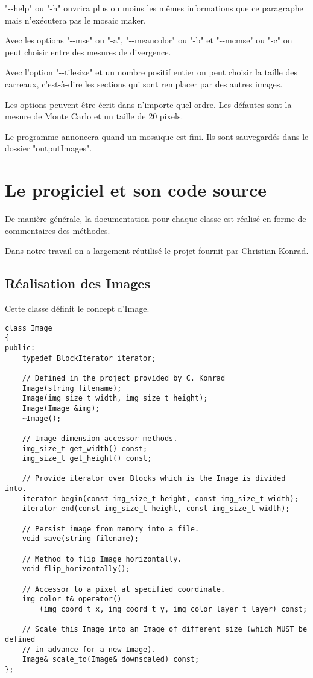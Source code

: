 \documentclass[a4paper]{article}
\begin{document}
"{-}{-}help" ou "-h" ouvrira plus ou moins les m\^emes informations que ce paragraphe mais n'ex\'ecutera pas le mosaic maker.

Avec les options "{-}{-}mse" ou "-a", "{-}{-}meancolor" ou "-b" et "{-}{-}mcmse" ou "-c" on peut choisir entre des mesures de divergence.

Avec l'option "{-}{-}tilesize" et un nombre positif entier on peut choisir la taille des carreaux, c'est-\`a-dire les sections qui sont remplacer par des autres images.

Les options peuvent \^etre \'ecrit dans n'importe quel ordre.
Les d\'efautes sont la mesure de Monte Carlo et un taille de 20 pixels.

Le programme annoncera quand un mosa\"ique est fini.
 Ils sont sauvegard\'es dans le dossier "outputImages". 

\section{Le progiciel et son code source}
De mani\`ere g\'en\'erale, la documentation pour chaque classe est r\'ealis\'e en forme de commentaires des m\'ethodes.

Dans notre travail on a largement r\'eutilis\'e le projet fournit par Christian Konrad.

\subsection{R\'ealisation des Images}
Cette classe d\'efinit le concept d'Image.

\begin{lstlisting}
class Image
{
public: 
	typedef BlockIterator iterator;
	
	// Defined in the project provided by C. Konrad
	Image(string filename);
	Image(img_size_t width, img_size_t height);
	Image(Image &img);
	~Image();
	
	// Image dimension accessor methods.
	img_size_t get_width() const;
	img_size_t get_height() const;
	
	// Provide iterator over Blocks which is the Image is divided into.
	iterator begin(const img_size_t height, const img_size_t width);
	iterator end(const img_size_t height, const img_size_t width);
	
	// Persist image from memory into a file.
	void save(string filename);
	
	// Method to flip Image horizontally.
	void flip_horizontally();
	
	// Accessor to a pixel at specified coordinate.
	img_color_t& operator()
		(img_coord_t x, img_coord_t y, img_color_layer_t layer) const;
	
	// Scale this Image into an Image of different size (which MUST be defined
	// in advance for a new Image).
	Image& scale_to(Image& downscaled) const; 
};
\end{lstlisting}
\end{document}
